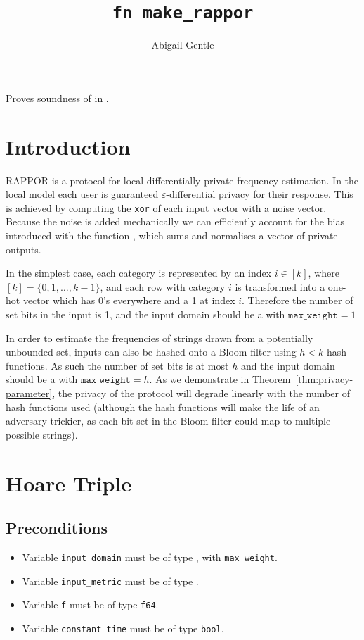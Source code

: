 \documentclass{article}
\title{\texttt{fn make\_rappor}}
\author{Abigail Gentle}
\begin{document}
\maketitle



\contrib

Proves soundness of  in .

\section{Introduction}
RAPPOR is a protocol for local-differentially private frequency estimation. In the local model each user is guaranteed $\varepsilon$-differential privacy for their response. This is achieved by computing the \texttt{xor} of each input vector with a noise vector. Because the noise is added mechanically we can efficiently account for the bias introduced with the function , which sums and normalises a vector of private outputs.

In the simplest case, each category is represented by an index $i\in[k]$, where $[k]=\{0,1,\ldots,k-1\}$, and each row with category $i$ is transformed into a one-hot vector which has 0's everywhere and a 1 at index $i$. Therefore the number of set bits in the input is 1, and the input domain should be a  with $\texttt{max\_weight}=1$

In order to estimate the frequencies of strings drawn from a potentially unbounded set, inputs can also be hashed onto a Bloom filter using $h<k$ hash functions. As such the number of set bits is at most $h$ and the input domain should be a  with $\texttt{max\_weight}=h$. As we demonstrate in Theorem~\ref{thm:privacy-parameter}, the privacy of the protocol will degrade linearly with the number of hash functions used (although the hash functions will make the life of an adversary trickier, as each bit set in the Bloom filter could map to multiple possible strings). 
\section{Hoare Triple}
\subsection{Preconditions}
\begin{itemize}
	\item Variable \texttt{input\_domain} must be of type , with \texttt{max\_weight}.
	\item Variable \texttt{input\_metric} must be of type .
	\item Variable \texttt{f} must be of type \texttt{f64}.
    \item Variable \texttt{constant\_time} must be of type \texttt{bool}.
\end{itemize}
\end{document}
